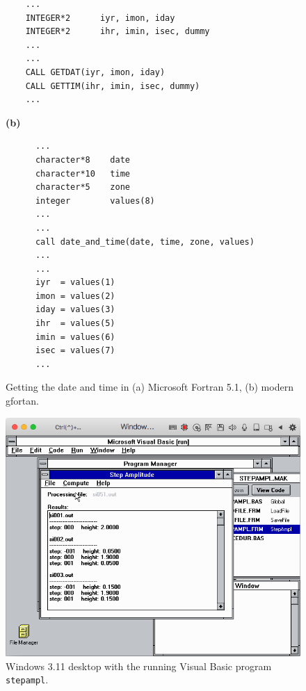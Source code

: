 \begin{supplement}
\begin{figure}[p]
\begin{minipage}{\textwidth}
\begin{lstlisting}
    ...
    INTEGER*2      iyr, imon, iday
    INTEGER*2      ihr, imin, isec, dummy
    ...
    ...
    CALL GETDAT(iyr, imon, iday)
    CALL GETTIM(ihr, imin, isec, dummy)
    ...

\end{lstlisting}
\end{minipage}
%
\hfill
%
\begin{minipage}{\textwidth}
\textbf{(b)}
\begin{lstlisting}
      ...
      character*8    date
      character*10   time
      character*5    zone
      integer        values(8)
      ...
      ...
      call date_and_time(date, time, zone, values)
      ...
      ...
      iyr  = values(1)
      imon = values(2)
      iday = values(3)
      ihr  = values(5)
      imin = values(6)
      isec = values(7)
      ...

\end{lstlisting}
\end{minipage}

\caption{Getting the date and time in (a) Microsoft Fortran 5.1, (b) modern gfortan.}
\label{fig:date-time}
\end{figure}




\begin{figure}[p]
    \centering
    \includegraphics[width = \textwidth]{figures/stepampl.png}
    \caption{Windows 3.11 desktop with the running Visual Basic program \texttt{stepampl}.}
    \label{fig:stepampl}
\end{figure}




\end{supplement}
